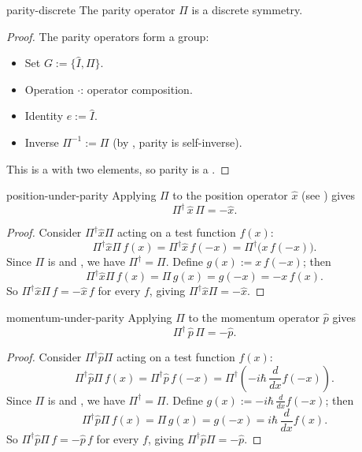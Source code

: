 \documentclass[12pt]{article}
\begin{document}
\begin{thm}{parity-discrete}
  The parity operator $\Pi$ is a discrete symmetry. 
\end{thm} 

\begin{proof}
  The parity operators form a group:
  \begin{itemize}[nosep]
    \item Set $G := \{\hat{I}, \Pi\}$.
    \item Operation $\cdot$: operator composition.
    \item Identity $e := \hat{I}$.
    \item Inverse $\Pi^{-1} := \Pi$ (by , parity is self-inverse).
  \end{itemize}
  This is a  with two elements, so parity is a .
\end{proof}

\begin{thm}{position-under-parity}
  Applying $\Pi$ to the position operator $\hat{x}$ (see ) gives
  \[
    \Pi^{\dagger}\,\hat{x}\,\Pi = -\hat{x}.
  \]
\end{thm}

\begin{proof}
  Consider $\Pi^{\dagger}\hat{x}\Pi$ acting on a test function $f(x)$:
  \[\Pi^{\dagger}\hat{x}\Pi\, f(x) = \Pi^{\dagger}\hat{x}\,f(-x) = \Pi^{\dagger}\bigl(x\,f(-x)\bigr).\]
  Since $\Pi$ is  and , we have $\Pi^{\dagger} = \Pi$. Define $g(x) := x\,f(-x)$; then
  \[\Pi^{\dagger}\hat{x}\Pi\, f(x) = \Pi\, g(x) = g(-x) = -x\,f(x).\]
  So $\Pi^{\dagger}\hat{x}\Pi\, f = -\hat{x}\, f$ for every $f$, giving $\Pi^{\dagger}\hat{x}\Pi = -\hat{x}$.
\end{proof}

\begin{thm}{momentum-under-parity}
  Applying $\Pi$ to the momentum operator $\hat{p}$ gives
  \[
    \Pi^{\dagger}\,\hat{p}\,\Pi = -\hat{p}.
  \]
\end{thm}

\begin{proof}
  Consider $\Pi^{\dagger}\hat{p}\Pi$ acting on a test function $f(x)$:
  \[\Pi^{\dagger}\hat{p}\Pi\, f(x) = \Pi^{\dagger}\hat{p}\,f(-x) = \Pi^{\dagger}\left(-i\hbar\,\frac{d}{dx}f(-x)\right).\]
  Since $\Pi$ is  and , we have $\Pi^{\dagger} = \Pi$. Define $g(x) := -i\hbar\,\frac{d}{dx}f(-x)$; then
  \[\Pi^{\dagger}\hat{p}\Pi\, f(x) = \Pi\, g(x) = g(-x) = i\hbar\,\frac{d}{dx}f(x).\]
  So $\Pi^{\dagger}\hat{p}\Pi\, f = -\hat{p}\, f$ for every $f$, giving $\Pi^{\dagger}\hat{p}\Pi = -\hat{p}$.
\end{proof}
\end{document}
